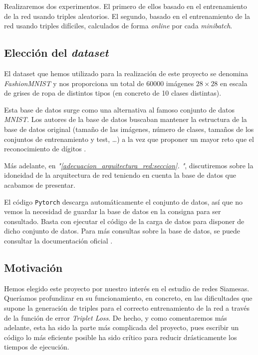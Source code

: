 \documentclass[11pt]{article}
\newcommand{\customcite}[1]{\emph{"\ref{#1}. \nameref{#1}"}}
\begin{document}
Realizaremos dos experimentos. El primero de ellos basado en el entrenamiento de la red usando triples aleatorios. El segundo, basado en el entrenamiento de la red usando triples difíciles, calculados de forma \emph{online} por cada \emph{minibatch}.

\subsection{Elección del \emph{dataset}}

El dataset que hemos utilizado para la realización de este proyecto se denomina \emph{FashionMNIST} \cite{zalando_dataset:online} y nos proporciona un total de 60000 imágenes $28 \times 28$ en escala de grises de ropa de distintos tipos (en concreto de 10 clases distintas).

Esta base de datos surge como una alternativa al famoso conjunto de datos \emph{MNIST}. Los autores de la base de datos buscaban mantener la estructura de la base de datos original (tamaño de las imágenes, número de clases, tamaños de los conjuntos de entrenamiento y test, \ldots) a la vez que proponer un mayor reto que el reconocimiento de dígitos \cite{database_why:online}.

Más adelante, en \customcite{adecuacion_arquitectura_red:seccion}, discutiremos sobre la idoneidad de la arquitectura de red teniendo en cuenta la base de datos que acabamos de presentar.

El código \lstinline{Pytorch} descarga automáticamente el conjunto de datos, así que no vemos la necesidad de guardar la base de datos en la consigna para ser consultado. Basta con ejecutar el código de la carga de datos para disponer de dicho conjunto de datos. Para más consultas sobre la base de datos, se puede consultar la documentación oficial \cite{zalando_dataset:online}.

\subsection{Motivación} \label{motivacion:seccion}

Hemos elegido este proyecto por nuestro interés en el estudio de redes Siamesas. Queríamos profundizar en su funcionamiento, en concreto, en las dificultades que supone la generación de triples para el correcto entrenamiento de la red a través de la función de error \emph{Triplet Loss}. De hecho, y como comentaremos más adelante, esta ha sido la parte más complicada del proyecto, pues escribir un código lo más eficiente posible ha sido crítico para reducir drásticamente los tiempos de ejecución.
\end{document}
